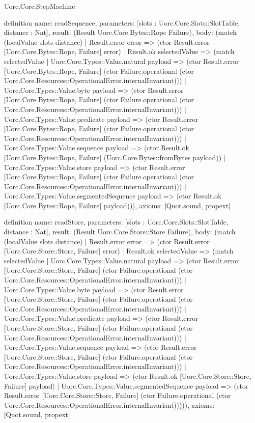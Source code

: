 \begin{lexlean}{Uorc.Core.StepMachine}
\begin{semanticmodule}
definition{
  name: readSequence,
  parameters: [slots : Uorc.Core.Slots::SlotTable, distance : Nat],
  result: (Result Uorc.Core.Bytes::Rope Failure),
  body: (match (localValue slots distance)
    | Result.error error => (ctor Result.error [Uorc.Core.Bytes::Rope, Failure] error)
    | Result.ok selectedValue => (match selectedValue
      | Uorc.Core.Types::Value.natural payload => (ctor Result.error [Uorc.Core.Bytes::Rope, Failure] (ctor Failure.operational (ctor Uorc.Core.Resources::OperationalError.internalInvariant)))
      | Uorc.Core.Types::Value.byte payload => (ctor Result.error [Uorc.Core.Bytes::Rope, Failure] (ctor Failure.operational (ctor Uorc.Core.Resources::OperationalError.internalInvariant)))
      | Uorc.Core.Types::Value.predicate payload => (ctor Result.error [Uorc.Core.Bytes::Rope, Failure] (ctor Failure.operational (ctor Uorc.Core.Resources::OperationalError.internalInvariant)))
      | Uorc.Core.Types::Value.sequence payload => (ctor Result.ok [Uorc.Core.Bytes::Rope, Failure] (Uorc.Core.Bytes::fromBytes payload))
      | Uorc.Core.Types::Value.store payload => (ctor Result.error [Uorc.Core.Bytes::Rope, Failure] (ctor Failure.operational (ctor Uorc.Core.Resources::OperationalError.internalInvariant)))
      | Uorc.Core.Types::Value.segmentedSequence payload => (ctor Result.ok [Uorc.Core.Bytes::Rope, Failure] payload))),
  axioms: [Quot.sound, propext]
}

definition{
  name: readStore,
  parameters: [slots : Uorc.Core.Slots::SlotTable, distance : Nat],
  result: (Result Uorc.Core.Store::Store Failure),
  body: (match (localValue slots distance)
    | Result.error error => (ctor Result.error [Uorc.Core.Store::Store, Failure] error)
    | Result.ok selectedValue => (match selectedValue
      | Uorc.Core.Types::Value.natural payload => (ctor Result.error [Uorc.Core.Store::Store, Failure] (ctor Failure.operational (ctor Uorc.Core.Resources::OperationalError.internalInvariant)))
      | Uorc.Core.Types::Value.byte payload => (ctor Result.error [Uorc.Core.Store::Store, Failure] (ctor Failure.operational (ctor Uorc.Core.Resources::OperationalError.internalInvariant)))
      | Uorc.Core.Types::Value.predicate payload => (ctor Result.error [Uorc.Core.Store::Store, Failure] (ctor Failure.operational (ctor Uorc.Core.Resources::OperationalError.internalInvariant)))
      | Uorc.Core.Types::Value.sequence payload => (ctor Result.error [Uorc.Core.Store::Store, Failure] (ctor Failure.operational (ctor Uorc.Core.Resources::OperationalError.internalInvariant)))
      | Uorc.Core.Types::Value.store payload => (ctor Result.ok [Uorc.Core.Store::Store, Failure] payload)
      | Uorc.Core.Types::Value.segmentedSequence payload => (ctor Result.error [Uorc.Core.Store::Store, Failure] (ctor Failure.operational (ctor Uorc.Core.Resources::OperationalError.internalInvariant))))),
  axioms: [Quot.sound, propext]
}


\end{semanticmodule}
\end{lexlean}
